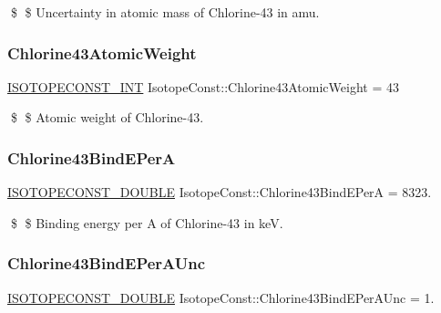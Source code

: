 \$ \$ Uncertainty in atomic mass of Chlorine-\/43 in amu. \mbox{\label{group___isotope_const-_chlorine-_cl43_gaf711f307d1993b5a591ec2cfd39fa6dc}} 
\subsubsection{\texorpdfstring{Chlorine43\+Atomic\+Weight}{Chlorine43AtomicWeight}}
{\footnotesize\ttfamily \mbox{\hyperlink{group___isotope_const-_macros_ga5f18360b3e99483a35c32d789e62621c}{I\+S\+O\+T\+O\+P\+E\+C\+O\+N\+S\+T\+\_\+\+I\+NT}} Isotope\+Const\+::\+Chlorine43\+Atomic\+Weight = 43}

\$ \$ Atomic weight of Chlorine-\/43. \mbox{\label{group___isotope_const-_chlorine-_cl43_ga23e8d1fa29552efb20b063ef70294b4a}} 
\subsubsection{\texorpdfstring{Chlorine43\+Bind\+E\+PerA}{Chlorine43BindEPerA}}
{\footnotesize\ttfamily \mbox{\hyperlink{group___isotope_const-_macros_ga8f45a7272ce02c0b4c65c44636ed719a}{I\+S\+O\+T\+O\+P\+E\+C\+O\+N\+S\+T\+\_\+\+D\+O\+U\+B\+LE}} Isotope\+Const\+::\+Chlorine43\+Bind\+E\+PerA = 8323.}

\$ \$ Binding energy per A of Chlorine-\/43 in keV. \mbox{\label{group___isotope_const-_chlorine-_cl43_gabaab9292ea57638a1fcc2545d0ba55de}} 
\subsubsection{\texorpdfstring{Chlorine43\+Bind\+E\+Per\+A\+Unc}{Chlorine43BindEPerAUnc}}
{\footnotesize\ttfamily \mbox{\hyperlink{group___isotope_const-_macros_ga8f45a7272ce02c0b4c65c44636ed719a}{I\+S\+O\+T\+O\+P\+E\+C\+O\+N\+S\+T\+\_\+\+D\+O\+U\+B\+LE}} Isotope\+Const\+::\+Chlorine43\+Bind\+E\+Per\+A\+Unc = 1.}

